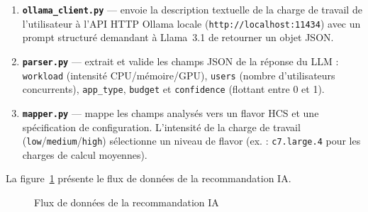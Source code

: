 \begin{enumerate}
  \item \textbf{\texttt{ollama\_client.py}} --- envoie la description textuelle de la
        charge de travail de l'utilisateur à l'API HTTP Ollama locale
        (\texttt{http://localhost:11434}) avec un prompt structuré demandant à
        Llama~3.1 de retourner un objet JSON.
  \item \textbf{\texttt{parser.py}} --- extrait et valide les champs JSON de la
        réponse du LLM : \texttt{workload} (intensité CPU/mémoire/GPU),
        \texttt{users} (nombre d'utilisateurs concurrents), \texttt{app\_type},
        \texttt{budget} et \texttt{confidence} (flottant entre 0 et 1).
  \item \textbf{\texttt{mapper.py}} --- mappe les champs analysés vers un flavor HCS
        et une spécification de configuration. L'intensité de la charge de travail
        (\texttt{low}/\texttt{medium}/\texttt{high}) sélectionne un niveau de flavor
        (ex. : \texttt{c7.large.4} pour les charges de calcul moyennes).
\end{enumerate}

La figure~\ref{fig:ai_flow} présente le flux de données de la recommandation IA.

\begin{figure}[H]
\centering
{}
\caption{Flux de données de la recommandation IA}
\label{fig:ai_flow}
\end{figure}

